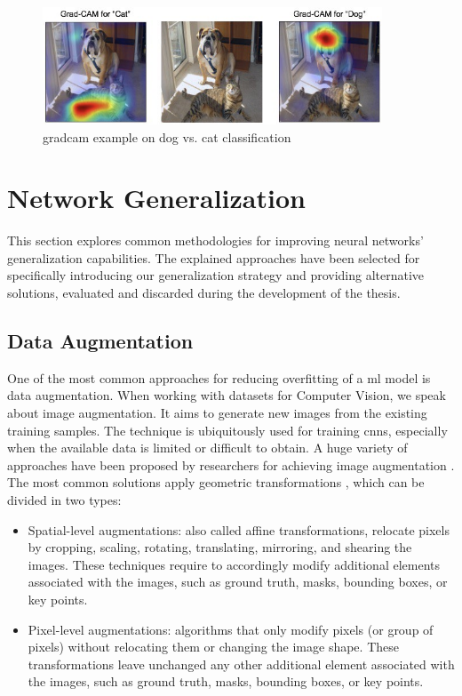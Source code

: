\begin{figure}[!htb]
    \centering
    \includegraphics[width=0.9\textwidth]{"contents/images/gradcam/02-gradcam-catdog"}
    \caption[\gls{gradcam} example on dog vs. cat classification]{\gls{gradcam} example on dog vs. cat classification \cite{Selvaraju_2019}}
    \label{fig:gradcam-catdog}
\end{figure}




\section{Network Generalization}
\label{sec:network-generalization}

This section explores common methodologies for improving neural networks' generalization capabilities. The explained approaches have been selected for specifically introducing our generalization strategy and providing alternative solutions, evaluated and discarded during the development of the thesis.



\subsection{Data Augmentation}
\label{subsec:data-augmentation}

One of the most common approaches for reducing overfitting of a \gls{ml} model is data augmentation. When working with datasets for Computer Vision, we speak about image augmentation. It aims to generate new images from the existing training samples. The technique is ubiquitously used for training \gls{cnn}s, especially when the available data is limited or difficult to obtain. A huge variety of approaches have been proposed by researchers for achieving image augmentation \cite{shorten2019augmentationsurvey}. The most common solutions apply geometric transformations \cite{xie2020unsupervised}, which can be divided in two types:
\begin{itemize}
	\item Spatial-level augmentations: also called affine transformations, relocate pixels by cropping, scaling, rotating, translating, mirroring, and shearing the images. These techniques require to accordingly modify additional elements associated with the images, such as ground truth, masks, bounding boxes, or key points.
	\item Pixel-level augmentations: algorithms that only modify pixels (or group of pixels) without relocating them or changing the image shape. These transformations leave unchanged any other additional element associated with the images, such as ground truth, masks, bounding boxes, or key points.
\end{itemize}


